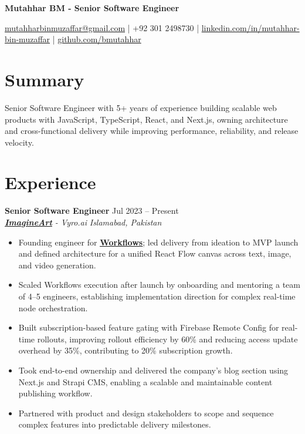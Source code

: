 \documentclass[9pt,letterpaper]{article}
\newcommand{\resumeHeader}[1]{%
  \begin{center}
    \vspace{2pt}
    {\fontsize{18pt}{20pt}\selectfont\bfseries #1\par}
    \vspace{4pt}
  \end{center}
}
\newcommand{\role}[4]{\textbf{#1} \hfill #2 \\
\textit{#3} \hfill \textit{#4}\\[-4pt]}
\begin{document}
\resumeHeader{Mutahhar BM - Senior Software Engineer}
\begin{center}
\fontsize{9pt}{11pt}\selectfont
\href{mailto:mutahharbinmuzaffar@gmail.com}{mutahharbinmuzaffar@gmail.com} \;|\; +92 301 2498730 \;|\;
\href{https://www.linkedin.com/in/mutahhar-bin-muzaffar}{linkedin.com/in/mutahhar-bin-muzaffar} \;|\;
\href{https://github.com/bmutahhar}{github.com/bmutahhar}
\end{center}

\section*{Summary}
Senior Software Engineer with 5+ years of experience building scalable web products with JavaScript, TypeScript, React, and Next.js, owning architecture and cross-functional delivery while improving performance, reliability, and release velocity.

\section*{Experience}
\role{Senior Software Engineer}{Jul 2023 -- Present}{\href{https://www.imagine.art/}{\textbf{\underline{ImagineArt}}} - Vyro.ai}{Islamabad, Pakistan}
\begin{itemize}[leftmargin=*, itemsep=0pt, topsep=0pt, partopsep=0pt, parsep=0pt, after=\vspace{2pt}]
  \item Founding engineer for \href{https://www.imagine.art/flow}{\textbf{\underline{Workflows}}}; led delivery from ideation to MVP launch and defined architecture for a unified React Flow canvas across text, image, and video generation.
  \item Scaled Workflows execution after launch by onboarding and mentoring a team of 4--5 engineers, establishing implementation direction for complex real-time node orchestration.
  \item Built subscription-based feature gating with Firebase Remote Config for real-time rollouts, improving rollout efficiency by 60\% and reducing access update overhead by 35\%, contributing to 20\% subscription growth.
  \item Took end-to-end ownership and delivered the company's blog section using Next.js and Strapi CMS, enabling a scalable and maintainable content publishing workflow.
  \item Partnered with product and design stakeholders to scope and sequence complex features into predictable delivery milestones.

\end{itemize}
\end{document}
